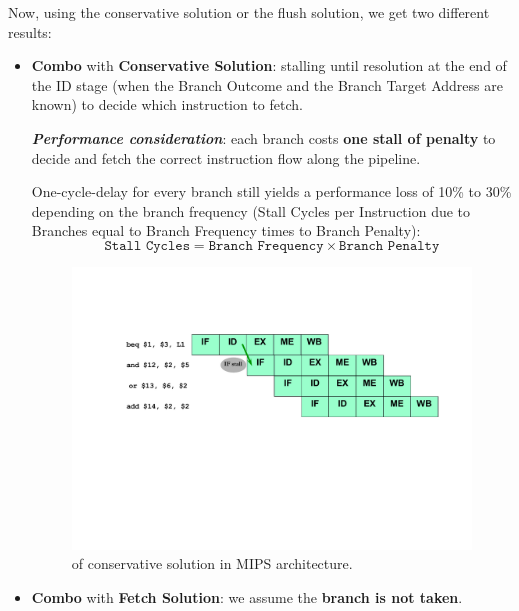 \noindent
Now, using the conservative solution or the flush solution, we get two different results:
\begin{itemize}
    \item \textbf{Combo} with \textbf{Conservative Solution}: stalling until resolution at the end of the ID stage (when the Branch Outcome and the Branch Target Address are known) to decide which instruction to fetch.

    \textbf{\emph{Performance consideration}}: each branch costs \textbf{one stall of penalty} to decide and fetch the correct instruction flow along the pipeline.

    One-cycle-delay for every branch still yields a performance loss of 10\% to 30\% depending on the branch frequency (Stall Cycles per Instruction due to Branches equal to Branch Frequency times to Branch Penalty):
    \begin{equation*}
        \texttt{Stall Cycles} = \texttt{Branch Frequency} \times \texttt{Branch Penalty}
    \end{equation*}

    \newpage

    \begin{figure}[!htp]
        \centering
        \includegraphics[width=\textwidth]{img/early-evalutation-of-the-pc-1.pdf}
        \caption{ of conservative solution in MIPS architecture.}
    \end{figure}

    \item \textbf{Combo} with \textbf{Fetch Solution}: we assume the \textbf{branch is not taken}.
    

\end{itemize}
